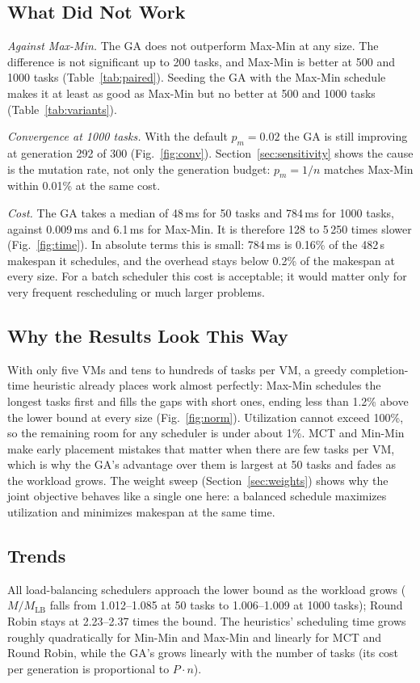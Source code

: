 \documentclass[journal,onecolumn,12pt]{IEEEtran}
\newcommand{\MLB}{M_{\mathrm{LB}}}
\begin{document}
\subsection{What Did Not Work}
\textit{Against Max-Min.} The GA does not outperform Max-Min at any size. The difference is not significant up to 200 tasks, and Max-Min is better at 500 and 1000 tasks (Table~\ref{tab:paired}). Seeding the GA with the Max-Min schedule makes it at least as good as Max-Min but no better at 500 and 1000 tasks (Table~\ref{tab:variants}).

\textit{Convergence at 1000 tasks.} With the default $p_m=0.02$ the GA is still improving at generation 292 of 300 (Fig.~\ref{fig:conv}). Section~\ref{sec:sensitivity} shows the cause is the mutation rate, not only the generation budget: $p_m=1/n$ matches Max-Min within 0.01\% at the same cost.

\textit{Cost.} The GA takes a median of 48\,ms for 50 tasks and 784\,ms for 1000 tasks, against 0.009\,ms and 6.1\,ms for Max-Min. It is therefore 128 to 5\,250 times slower (Fig.~\ref{fig:time}). In absolute terms this is small: 784\,ms is 0.16\% of the 482\,s makespan it schedules, and the overhead stays below 0.2\% of the makespan at every size. For a batch scheduler this cost is acceptable; it would matter only for very frequent rescheduling or much larger problems.

\subsection{Why the Results Look This Way}
With only five VMs and tens to hundreds of tasks per VM, a greedy completion-time heuristic already places work almost perfectly: Max-Min schedules the longest tasks first and fills the gaps with short ones, ending less than 1.2\% above the lower bound at every size (Fig.~\ref{fig:norm}). Utilization cannot exceed 100\%, so the remaining room for any scheduler is under about 1\%. MCT and Min-Min make early placement mistakes that matter when there are few tasks per VM, which is why the GA's advantage over them is largest at 50 tasks and fades as the workload grows. The weight sweep (Section~\ref{sec:weights}) shows why the joint objective behaves like a single one here: a balanced schedule maximizes utilization and minimizes makespan at the same time.

\subsection{Trends}
All load-balancing schedulers approach the lower bound as the workload grows ($M/\MLB$ falls from 1.012--1.085 at 50 tasks to 1.006--1.009 at 1000 tasks); Round Robin stays at 2.23--2.37 times the bound. The heuristics' scheduling time grows roughly quadratically for Min-Min and Max-Min and linearly for MCT and Round Robin, while the GA's grows linearly with the number of tasks (its cost per generation is proportional to $P\cdot n$).
\end{document}

